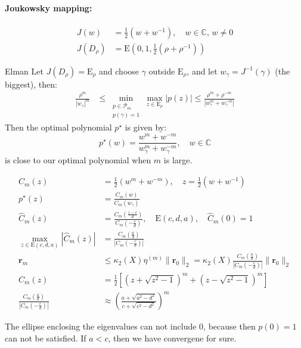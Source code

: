 \paragraph{Joukowsky mapping:}
\begin{align*}
    J(w)      & = \frac{1}{2}(w + w^{-1}), \quad w \in \mathbb{C}, \, w \neq 0 \\
    J(D_\rho) & = \mathrm{E}(0,1, \frac12(\rho + \rho^{-1}))
\end{align*}
\begin{theorem}{Elman}{}
    Let $J(D_\rho) = \mathrm{E}_\rho$ and choose $\gamma$ outside $\mathrm{E}_\rho$, and let  $ w_\gamma = J^{-1}(\gamma)$ (the biggest), then:
    \begin{align*}
        \frac{\rho^m}{|w_\gamma|^m} & \leq \min_{\substack{p \in \mathcal{P}_m \\ p(\gamma) = 1}} \max_{z \in \mathrm{E}_\rho} |p(z)| \leq \frac{\rho^m + \rho^{-m}}{|w_\gamma^m + w_\gamma^{-m}|}
    \end{align*}
    Then the optimal polynomial $p^\star$ is given by:
    \[
        p^\star(w) = \frac{w^m + w^{-m}}{w_\gamma^m + w_\gamma^{-m}}, \quad w \in \mathbb{C}
    \]
    is close to our optimal polynomial when $m$ is large.
\end{theorem}

\begin{align*}
    C_m(z)                                        & = \frac{1}{2}(w^m + w^{-m}), \quad z = \frac{1}{2}(w + w^{-1})                                                               \\
    p^\star(z)                                    & = \frac{C_m(w)}{C_m(w_\gamma)}                                                                                               \\
    \hat{C}_m(z)                                  & = \frac{C_m(\frac{z - c}{d})}{C_m(-\frac{c}{d})}, \quad \mathrm{E}(c,d,a), \quad \hat{C}_m(0) = 1                            \\
    \max_{z \in \mathrm{E}(c,d,a)} |\hat{C}_m(z)| & = \frac{C_m(\frac{a}{d})}{|C_m(-\frac{c}{d})|}                                                                               \\
    \mathbf{r}_m                                  & \leq \kappa_2(X) \eta^{(m)} \|\mathbf{r}_0\|_2 = \kappa_2(X) \frac{C_m(\frac{a}{d})}{|C_m(-\frac{c}{d})|} \|\mathbf{r}_0\|_2 \\
    C_m(z)                                        & = \frac{1}{2}\left[\left(z + \sqrt{z^2 - 1}\right)^m + \left(z - \sqrt{z^2 - 1}\right)^m\right]                              \\
    \frac{C_m(\frac{a}{d})}{|C_m(-\frac{c}{d})|}  & \approx \left(\frac{a + \sqrt{a^2 - d^2}}{c + \sqrt{c^2 - d^2}}\right)^m
\end{align*}

The ellipse enclosing the eigenvalues can not include $0$, because then $p(0) = 1$ can not be satisfied.
If $a < c$, then we have convergene for sure.




